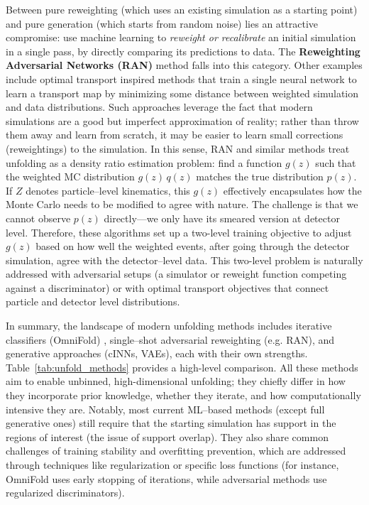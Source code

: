         Between pure reweighting (which uses an existing simulation as a starting point) and pure generation (which starts from random noise) lies an attractive compromise: use machine learning to \emph{reweight or recalibrate} an initial simulation in a single pass, by directly comparing its predictions to data.
        The \textbf{Reweighting Adversarial Networks (RAN)} method falls into this category.
        Other examples include optimal transport inspired methods that train a single neural network to learn a transport map by minimizing some distance between weighted simulation and data distributions.
        Such approaches leverage the fact that modern simulations are a good but imperfect approximation of reality; rather than throw them away and learn from scratch, it may be easier to learn small corrections (reweightings) to the simulation.
        In this sense, RAN and similar methods treat unfolding as a density ratio estimation problem: find a function $g(z)$ such that the weighted MC distribution $g(z)\,q(z)$ matches the true distribution $p(z)$.
        If $Z$ denotes particle--level kinematics, this $g(z)$ effectively encapsulates how the Monte Carlo needs to be modified to agree with nature.
        The challenge is that we cannot observe $p(z)$ directly---we only have its smeared version at detector level.
        Therefore, these algorithms set up a {two-level} training objective to adjust $g(z)$ based on how well the weighted events, after going through the detector simulation, agree with the detector--level data.
        This two-level problem is naturally addressed with adversarial setups (a simulator or reweight function competing against a discriminator) or with optimal transport objectives that connect particle and detector level distributions.

        In summary, the landscape of modern unfolding methods includes iterative classifiers (OmniFold) , single--shot adversarial reweighting (e.g. RAN), and generative approaches (cINNs, VAEs), each with their own strengths.
        Table~\ref{tab:unfold_methods} provides a high-level comparison.
        All these methods aim to enable unbinned, high-dimensional unfolding; they chiefly differ in how they incorporate prior knowledge, whether they iterate, and how computationally intensive they are.
        Notably, most current ML--based methods (except full generative ones) still require that the starting simulation has support in the regions of interest (the issue of support overlap).
        They also share common challenges of training stability and overfitting prevention, which are addressed through techniques like regularization or specific loss functions (for instance, OmniFold uses early stopping of iterations, while adversarial methods use regularized discriminators).

